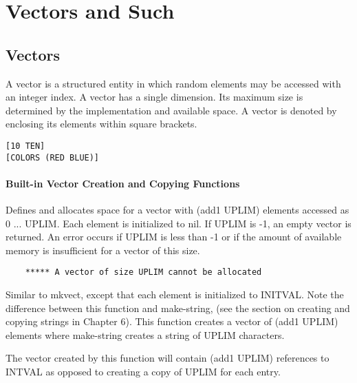 
\chapter{Vectors and Such}

\section{Vectors}

  A  vector  is a structured entity in which random elements may
be accessed with an integer  index.    A  vector  has  a  single
dimension.  Its maximum size is determined by the implementation
and  available  space.    A  vector  is denoted by enclosing its
elements within square brackets.
\begin{verbatim}
[10 TEN]
[COLORS (RED BLUE)]
\end{verbatim}


\subsubsection{Built-in Vector Creation and Copying Functions}

{    Defines  and  allocates space for a vector with (add1 UPLIM)
    elements  accessed  as  0  ...  UPLIM.    Each  element   is
    initialized  to  nil.    If  UPLIM is -1, an empty vector is
    returned.  An error occurs if UPLIM is less than  -1  or  if
    the  amount of available memory is insufficient for a vector
    of this size.
}
\begin{verbatim}
    ***** A vector of size UPLIM cannot be allocated
\end{verbatim}

{    Similar to mkvect, except that each element  is  initialized
    to  INITVAL.   Note the difference between this function and
    make-string,  (see  the  section  on  creating  and  copying
    strings  in  Chapter  6).  This function creates a vector of
    (add1 UPLIM) elements where make-string creates a string  of
    UPLIM characters.
}

    The  vector  created  by  this  function  will contain (add1
    UPLIM) references to INTVAL as opposed to creating a copy of
    UPLIM for each entry.

